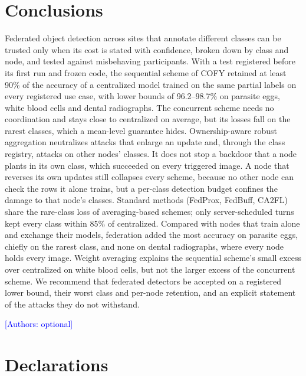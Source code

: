 \documentclass[pdflatex,sn-mathphys-num]{sn-jnl}
\newcommand{\authornote}[1]{\textcolor{blue}{[Authors: #1]}}
\newcommand{\sys}{COFY}
\begin{document}
\section{Conclusions}\label{sec:conclusion}
Federated object detection across sites that annotate different classes can be trusted only when its cost is stated with confidence, broken down by class and node, and tested against misbehaving participants. With a test registered before its first run and frozen code, the sequential scheme of \sys{} retained at least 90\% of the accuracy of a centralized model trained on the same partial labels on every registered use case, with lower bounds of 96.2--98.7\% on parasite eggs, white blood cells and dental radiographs. The concurrent scheme needs no coordination and stays close to centralized on average, but its losses fall on the rarest classes, which a mean-level guarantee hides. Ownership-aware robust aggregation neutralizes attacks that enlarge an update and, through the class registry, attacks on other nodes' classes. It does not stop a backdoor that a node plants in its own class, which succeeded on every triggered image. A node that reverses its own updates still collapses every scheme, because no other node can check the rows it alone trains, but a per-class detection budget confines the damage to that node's classes. Standard methods (FedProx, FedBuff, CA2FL) share the rare-class loss of averaging-based schemes; only server-scheduled turns kept every class within 85\% of centralized. Compared with nodes that train alone and exchange their models, federation added the most accuracy on parasite eggs, chiefly on the rarest class, and none on dental radiographs, where every node holds every image. Weight averaging explains the sequential scheme's small excess over centralized on white blood cells, but not the larger excess of the concurrent scheme. We recommend that federated detectors be accepted on a registered lower bound, their worst class and per-node retention, and an explicit statement of the attacks they do not withstand.

\backmatter

\authornote{optional}

\section*{Declarations}
\end{document}

